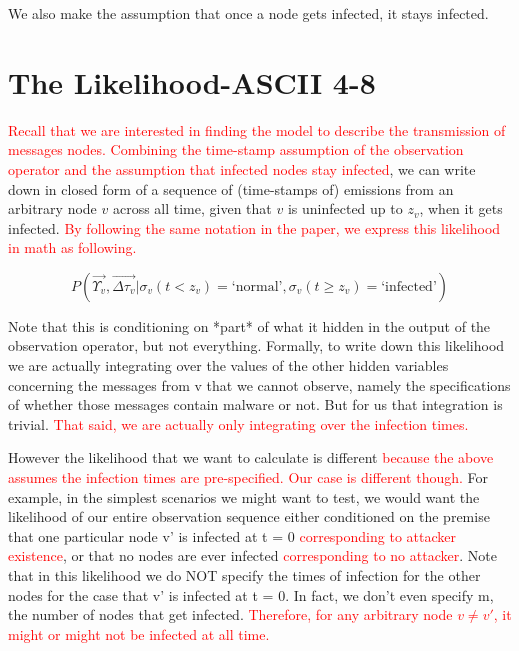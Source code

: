 \documentclass{article}
\begin{document}
	We also make the assumption that once a node gets infected, it
	stays infected.

\section{The Likelihood-ASCII 4-8}
	\textcolor{red}{Recall that we are interested in finding the model to describe
	the transmission of messages nodes.
	Combining the time-stamp assumption of the observation operator and the assumption
	that infected nodes stay infected}, we can write down in closed form of a sequence of
	(time-stamps of) emissions from an arbitrary node $v$ across all time, given that 
	$v$ is uninfected up to $z_{v}$, when it gets infected. \textcolor{red}{By following
	the same notation in the paper, we express this likelihood in math as
	following.}

	\begin{equation*}
		P(\vec{\Upsilon_{v}}, \vec{\Delta\tau_{v}} | \sigma_{v}(t < z_{v}) = 
		\text{`normal'}, \sigma_{v}(t \geq z_{v}) = \text{`infected'})
	\end{equation*}

	Note that this is conditioning on *part* of what it hidden in the
	output of the observation operator, but not everything.  Formally, to
	write down this likelihood we are actually integrating over the values
	of the other hidden variables concerning the messages from v that we
	cannot observe, namely the specifications of whether those messages
	contain malware or not. But for us that integration is trivial. 
	\textcolor{red}{That said, we are actually only integrating over the infection
	times.}

	However the likelihood that we want to calculate is different 
	\textcolor{red}{because the above assumes the infection times are pre-specified. Our
	case is different though.} For example, in the simplest scenarios we might want
	to test, we would want the likelihood of our entire observation
	sequence either conditioned on the premise that one particular node
	v' is infected at t = 0 \textcolor{red}{corresponding to attacker existence}, or that
	no nodes are ever infected \textcolor{red}{corresponding to no attacker}. Note
	that in this likelihood we do NOT specify the times of infection for
	the other nodes for the case that v' is infected at t = 0. In fact,
	we don't even specify m, the number of nodes that get infected. 
	\textcolor{red}{Therefore, for any arbitrary node $v \neq v'$, it might or might
	not be infected at all time.}
\end{document}

